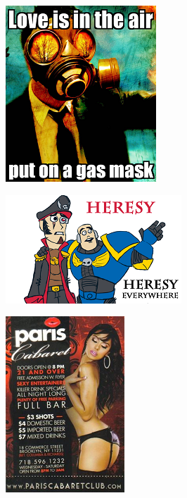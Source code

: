 \begin{figure}
	\begin{center}
		\includegraphics[width=\figwidth]{pics/6/10.png}
	\end{center}
\end{figure}

\begin{figure}
	\begin{center}
		\includegraphics[width=\figwidth]{pics/6/11.png}
	\end{center}
\end{figure}

\begin{figure}
	\begin{center}
		\includegraphics[width=\figwidth]{pics/6/12.png}
	\end{center}
\end{figure}

